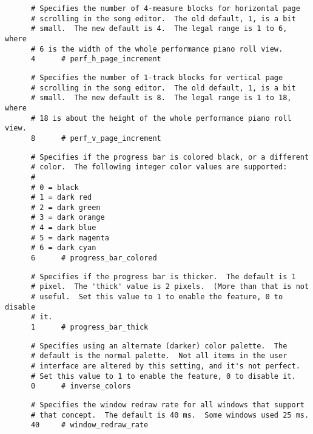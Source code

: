    \begin{verbatim}
      # Specifies the number of 4-measure blocks for horizontal page
      # scrolling in the song editor.  The old default, 1, is a bit
      # small.  The new default is 4.  The legal range is 1 to 6, where
      # 6 is the width of the whole performance piano roll view.
      4      # perf_h_page_increment
   \end{verbatim}

   \begin{verbatim}
      # Specifies the number of 1-track blocks for vertical page
      # scrolling in the song editor.  The old default, 1, is a bit
      # small.  The new default is 8.  The legal range is 1 to 18, where
      # 18 is about the height of the whole performance piano roll view.
      8      # perf_v_page_increment
   \end{verbatim}

   \begin{verbatim}
      # Specifies if the progress bar is colored black, or a different
      # color.  The following integer color values are supported:
      # 
      # 0 = black
      # 1 = dark red
      # 2 = dark green
      # 3 = dark orange
      # 4 = dark blue
      # 5 = dark magenta
      # 6 = dark cyan
      6      # progress_bar_colored
   \end{verbatim}

   \begin{verbatim}
      # Specifies if the progress bar is thicker.  The default is 1
      # pixel.  The 'thick' value is 2 pixels.  (More than that is not
      # useful.  Set this value to 1 to enable the feature, 0 to disable
      # it.
      1      # progress_bar_thick
   \end{verbatim}

   \begin{verbatim}
      # Specifies using an alternate (darker) color palette.  The
      # default is the normal palette.  Not all items in the user
      # interface are altered by this setting, and it's not perfect.
      # Set this value to 1 to enable the feature, 0 to disable it.
      0      # inverse_colors
   \end{verbatim}

   \begin{verbatim}
      # Specifies the window redraw rate for all windows that support
      # that concept.  The default is 40 ms.  Some windows used 25 ms.
      40     # window_redraw_rate
   \end{verbatim}


